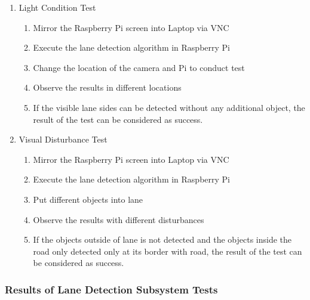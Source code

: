 \documentclass[a4paper,12pt]{article}
\begin{document}
\begin{enumerate}

\item{Light Condition Test}

\begin{enumerate}

\item Mirror the Raspberry Pi screen into Laptop via VNC  

\item Execute the lane detection algorithm in Raspberry Pi 

\item Change the location of the camera and Pi to conduct test 

\item Observe the results in different locations   

\item If the visible lane sides can be detected without any additional object, the result of the test can be considered as success. 

\end{enumerate}

\item{Visual Disturbance Test}

\begin{enumerate}

\item Mirror the Raspberry Pi screen into Laptop via VNC   

\item Execute the lane detection algorithm in Raspberry Pi  

\item Put different objects into lane  

\item Observe the results with different disturbances 

\item If the objects outside of lane is not detected and the objects inside the road only detected only at its border with road, the result of the test can be considered as success.  

\end{enumerate}

\end{enumerate}


\subsubsection*{Results of Lane Detection Subsystem Tests}
\end{document}
